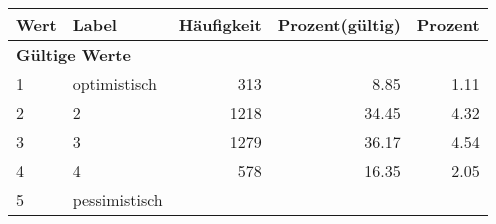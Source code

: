      \begin{longtable}{lXrrr}
     \toprule
     \textbf{Wert} & \textbf{Label} & \textbf{Häufigkeit} & \textbf{Prozent(gültig)} & \textbf{Prozent} \\
     \endhead
     \midrule
     \multicolumn{5}{l}{\textbf{Gültige Werte}}\\

     1 &
     \multicolumn{1}{X}{ optimistisch   } &


       \num{313} &
       \num[round-mode=places,round-precision=2]{8.85} &
         \num[round-mode=places,round-precision=2]{1.11} \\

     2 &
     \multicolumn{1}{X}{ 2   } &


       \num{1218} &
       \num[round-mode=places,round-precision=2]{34.45} &
         \num[round-mode=places,round-precision=2]{4.32} \\

     3 &
     \multicolumn{1}{X}{ 3   } &


       \num{1279} &
       \num[round-mode=places,round-precision=2]{36.17} &
         \num[round-mode=places,round-precision=2]{4.54} \\

     4 &
     \multicolumn{1}{X}{ 4   } &


       \num{578} &
       \num[round-mode=places,round-precision=2]{16.35} &
         \num[round-mode=places,round-precision=2]{2.05} \\

     5 &
     \multicolumn{1}{X}{ pessimistisch   } &



\end{longtable}
